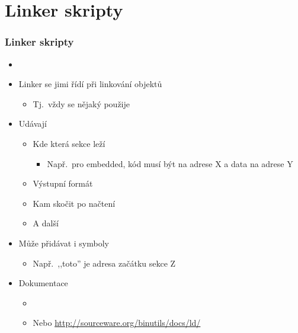 
\section{Linker skripty}
\frame{\sectionpage}

\begin{frame}
  \frametitle{Linker skripty}

  \begin{itemize}
    \item {}
    \item Linker se jimi řídí při linkování objektů
    \begin{itemize}
      \item Tj.\ vždy se nějaký použije
    \end{itemize}

    \pause

    \item Udávají
    \begin{itemize}
      \item Kde která sekce leží
      \begin{itemize}
	\item Např.\ pro embedded, kód musí být na adrese X a data na adrese Y
      \end{itemize}

      \item Výstupní formát
      \item Kam skočit po načtení
      \item A další
    \end{itemize}

    \pause

    \item Může přidávat i symboly
    \begin{itemize}
      \item Např.\ ,,toto'' je adresa začátku sekce Z
    \end{itemize}

    \item Dokumentace
    \begin{itemize}
      \item {}
      \item Nebo \url{http://sourceware.org/binutils/docs/ld/}
    \end{itemize}

  \end{itemize}

\end{frame}

